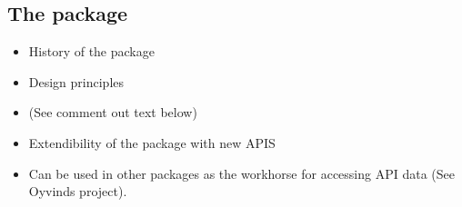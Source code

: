 \subsection{The  package}

\begin{itemize}
    \item History of the package
    \item Design principles
    \item (See comment out text below)
    \item Extendibility of the package with new APIS
    \item Can be used in other packages as the workhorse for accessing API data (See Oyvinds project).
\end{itemize}




